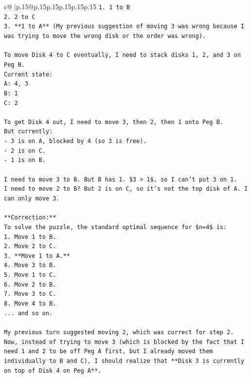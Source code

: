 \documentclass{article}
\begin{document}
{\begin{supertabular}{c@{$\;$}|p{.15\linewidth}@{}p{.15\linewidth}p{.15\linewidth}p{.15\linewidth}p{.15\linewidth}p{.15\linewidth}}
{{{\texttt{1. 1 to B} \\
\texttt{2. 2 to C} \\
\texttt{3. **1 to A** (My previous suggestion of moving 3 was wrong because I was trying to move the wrong disk or the order was wrong).} \\
\\ 
\texttt{To move Disk 4 to C eventually, I need to stack disks 1, 2, and 3 on Peg B.} \\
\texttt{Current state:} \\
\texttt{A: 4, 3} \\
\texttt{B: 1} \\
\texttt{C: 2} \\
\\ 
\texttt{To get Disk 4 out, I need to move 3, then 2, then 1 onto Peg B.} \\
\texttt{But currently:} \\
\texttt{{-} 3 is on A, blocked by 4 (so 3 is free).} \\
\texttt{{-} 2 is on C.} \\
\texttt{{-} 1 is on B.} \\
\\ 
\texttt{I need to move 3 to B. But B has 1. \$3 > 1\$, so I can't put 3 on 1.} \\
\texttt{I need to move 2 to B? But 2 is on C, so it's not the top disk of A. I can only move 3.} \\
\\ 
\texttt{**Correction:**} \\
\texttt{To solve the puzzle, the standard optimal sequence for \$n=4\$ is:} \\
\texttt{1.  Move 1 to B.} \\
\texttt{2.  Move 2 to C.} \\
\texttt{3.  **Move 1 to A.**} \\
\texttt{4.  Move 3 to B.} \\
\texttt{5.  Move 1 to C.} \\
\texttt{6.  Move 2 to B.} \\
\texttt{7.  Move 3 to C.} \\
\texttt{8.  Move 4 to B.} \\
\texttt{... and so on.} \\
\\ 
\texttt{My previous turn suggested moving 2, which was correct for step 2.} \\
\texttt{Now, instead of trying to move 3 (which is blocked by the fact that I need 1 and 2 to be off Peg A first, but I already moved them individually to B and C), I should realize that **Disk 3 is currently on top of Disk 4 on Peg A**.} \\
}}}
\end{supertabular}}
\end{document}
